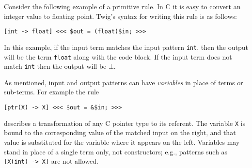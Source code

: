 Consider the following example of a primitive rule. In C it is
easy to convert an integer value to floating point. Twig's syntax
for writing this rule is as follows:

\begin{verbatim}
[int -> float] <<< $out = (float)$in; >>>
\end{verbatim}

In this example, if the input term matches the input pattern
\texttt{int}, then the output will be the term \texttt{float}
along with the code block. If the input term does not match
\texttt{int} then the output will be $\bot$.

As mentioned, input and output patterns can have \emph{variables}
in place of terms or sub-terms. For example the rule

\begin{verbatim}
[ptr(X) -> X] <<< $out = &$in; >>>
\end{verbatim}

describes a transformation of any C pointer type to its referent.
The variable \texttt{X} is bound to the corresponding value of the
matched input on the right, and that value is substituted for the
variable where it appears on the left. Variables may stand in
place of a single term only, not constructors; e.g., patterns such
as \texttt{[X(int)~->~X]} are not allowed.




